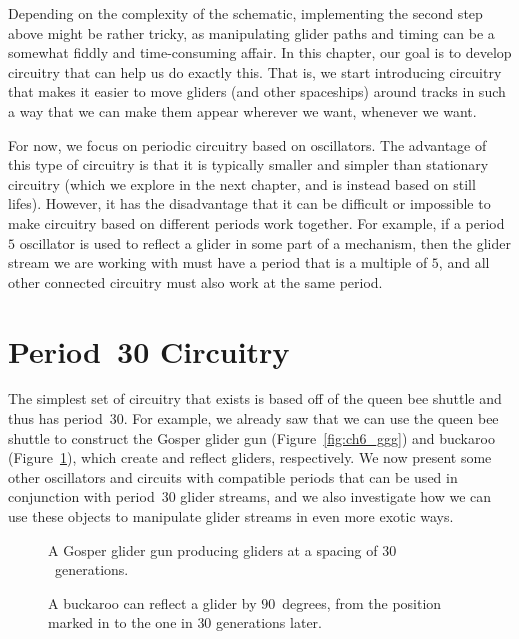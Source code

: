 Depending on the complexity of the schematic, implementing the second step above might be rather tricky, as manipulating glider paths and timing can be a somewhat fiddly and time-consuming affair. In this chapter, our goal is to develop circuitry that can help us do exactly this. That is, we start introducing circuitry that makes it easier to move gliders (and other spaceships) around tracks in such a way that we can make them appear wherever we want, whenever we want.

For now, we focus on periodic circuitry based on oscillators. The advantage of this type of circuitry is that it is typically smaller and simpler than stationary circuitry (which we explore in the next chapter, and is instead based on still lifes). However, it has the disadvantage that it can be difficult or impossible to make circuitry based on different periods work together. For example, if a period $5$ oscillator is used to reflect a glider in some part of a mechanism, then the glider stream we are working with must have a period that is a multiple of $5$, and all other connected circuitry must also work at the same period.


\section{Period~30 Circuitry}\label{sec:p30}

The simplest set of circuitry that exists is based off of the queen bee shuttle and thus has period~$30$. For example, we already saw that we can use the queen bee shuttle to construct the Gosper glider gun (Figure~\ref{fig:ch6_ggg}) and buckaroo (Figure~\ref{fig:buckaroo_reflect}), which create and reflect gliders, respectively. We now present some other oscillators and circuits with compatible periods that can be used in conjunction with period~$30$ glider streams, and we also investigate how we can use these objects to manipulate glider streams in even more exotic ways.


\begin{figure}[!htb]
	\centering
	\begin{minipage}[b]{0.48\textwidth}
		\centering
		\caption{A Gosper glider gun producing gliders at a spacing of $30$~generations.}\label{fig:ch6_ggg}
	\end{minipage}\hfill
	\begin{minipage}[b]{0.48\textwidth}
		\centering
		\caption{A buckaroo can reflect a glider by $90$~degrees, from the position marked in  to the one in  $30$ generations later.}\label{fig:buckaroo_reflect}
	\end{minipage}
\end{figure}


